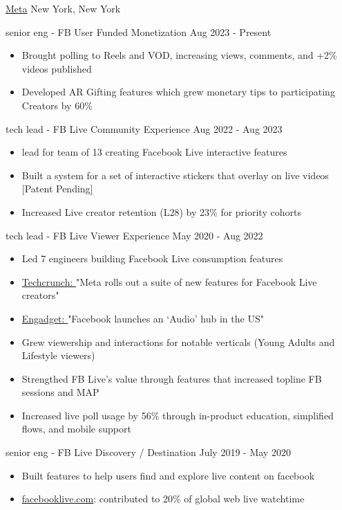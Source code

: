 \documentclass[11pt]{article}
\begin{document}
\headedsection  %
{\href{http://www.about.fb.com/}{Meta}}
{New York, New York}
{
    \headedsubsection
    {senior eng - FB User Funded Monetization }
    {Aug 2023 - Present}
    {
        \begin{itemize}
            \item Brought polling to Reels and VOD, increasing views, comments, and +2\% videos published
            \item Developed AR Gifting features which grew monetary tips to participating Creators by 60\%
        \end{itemize}

    }
    \headedsubsection
    {tech lead - FB Live Community Experience}
    {Aug 2022 - Aug 2023}
    {
        \begin{itemize}
            \item lead for team of 13 creating Facebook Live interactive features
            \item Built a system for a set of interactive stickers that overlay on live videos [Patent Pending]
            \item Increased Live creator retention (L28) by 23\% for priority cohorts
        \end{itemize}

    }
    \headedsubsection
    {tech lead - FB Live Viewer Experience}
    {May 2020 - Aug 2022}
    {
        \begin{itemize}
            \item Led 7 engineers building Facebook Live consumption features
            \item 
                \href{https://techcrunch.com/2021/12/09/meta-rolls-out-a-suite-of-new-features-and-discovery-tools-for-facebook-live-creators}{Techcrunch: }
                "Meta rolls out a suite of new features for Facebook Live creators"
            \item 
                \href{https://www.engadget.com/facebook-audio-content-hub-live-audio-rooms-podcasts-170633543.html}
                {Engadget: }
                "Facebook launches an ‘Audio’ hub in the US"
            \item Grew viewership and interactions for notable verticals (Young Adults and Lifestyle viewers)
            \item Strengthed FB Live's value through features that increased topline FB sessions and MAP
            \item Increased live poll usage by 56\% through in-product education, simplified flows, and mobile support
        \end{itemize}
    }
    \headedsubsection
    {senior eng - FB Live Discovery / Destination} 
    {July 2019 - May 2020}
    {
        \begin{itemize}
            \item Built features to help users find and explore live content on facebook 
            \item {\href{http://www.facebooklive.com/}{facebooklive.com}}: contributed to 20\% of global web live watchtime
        \end{itemize}

    }
}
\end{document}
